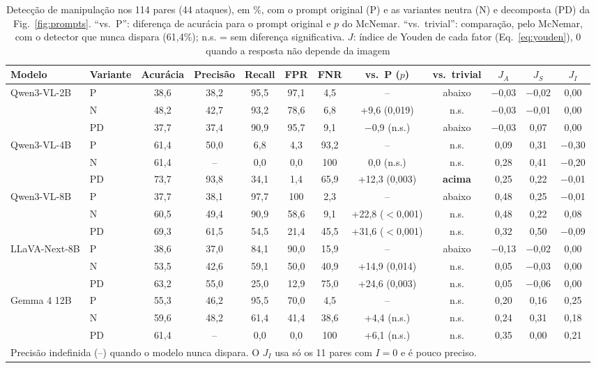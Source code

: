 \documentclass[conference]{IEEEtran}
\begin{document}
\begin{table}[!t]
\renewcommand{\arraystretch}{1.0}
\caption{Detecção de manipulação nos 114 pares (44 ataques), em \%, com o prompt original (P) e as
variantes neutra (N) e decomposta (PD) da Fig.~\ref{fig:prompts}. ``vs.~P'': diferença de acurácia para o
prompt original e $p$ do McNemar. ``vs.~trivial'': comparação, pelo McNemar, com o detector que nunca
dispara (61,4\%); n.s. = sem diferença significativa. $J$: índice de Youden de cada fator
(Eq.~\ref{eq:youden}), 0 quando a resposta não depende da imagem}
\label{tab:man}
\centering
\footnotesize
\setlength{\tabcolsep}{4.2pt}
\begin{tabular}{llcccccccccc}
\toprule
Modelo & Variante & Acurácia & Precisão & Recall & FPR & FNR & vs.~P ($p$) & vs.~trivial & $J_A$ & $J_S$ & $J_I$ \\
\midrule
\multirow{3}{*}{Qwen3-VL-2B}
 & P  & 38,6 & 38,2 & 95,5 & 97,1 & 4,5 & -- & abaixo & $-$0,03 & $-$0,02 & 0,00 \\
 & N  & 48,2 & 42,7 & 93,2 & 78,6 & 6,8 & +9,6 (0,019) & n.s. & $-$0,03 & $-$0,01 & 0,00 \\
 & PD & 37,7 & 37,4 & 90,9 & 95,7 & 9,1 & $-$0,9 (n.s.) & abaixo & $-$0,03 & 0,07 & 0,00 \\
\midrule
\multirow{3}{*}{Qwen3-VL-4B}
 & P  & 61,4 & 50,0 & 6,8 & 4,3 & 93,2 & -- & n.s. & 0,09 & 0,31 & $-$0,30 \\
 & N  & 61,4 & -- & 0,0 & 0,0 & 100 & 0,0 (n.s.) & n.s. & 0,28 & 0,41 & $-$0,20 \\
 & PD & 73,7 & 93,8 & 34,1 & 1,4 & 65,9 & +12,3 (0,003) & \textbf{acima} & 0,25 & 0,22 & $-$0,01 \\
\midrule
\multirow{3}{*}{Qwen3-VL-8B}
 & P  & 37,7 & 38,1 & 97,7 & 100 & 2,3 & -- & abaixo & 0,48 & 0,25 & $-$0,01 \\
 & N  & 60,5 & 49,4 & 90,9 & 58,6 & 9,1 & +22,8 ($<$0,001) & n.s. & 0,48 & 0,22 & 0,08 \\
 & PD & 69,3 & 61,5 & 54,5 & 21,4 & 45,5 & +31,6 ($<$0,001) & n.s. & 0,32 & 0,50 & $-$0,09 \\
\midrule
\multirow{3}{*}{LLaVA-Next-8B}
 & P  & 38,6 & 37,0 & 84,1 & 90,0 & 15,9 & -- & abaixo & $-$0,13 & $-$0,02 & 0,00 \\
 & N  & 53,5 & 42,6 & 59,1 & 50,0 & 40,9 & +14,9 (0,014) & n.s. & 0,05 & $-$0,03 & 0,00 \\
 & PD & 63,2 & 55,0 & 25,0 & 12,9 & 75,0 & +24,6 (0,003) & n.s. & 0,05 & $-$0,06 & 0,00 \\
\midrule
\multirow{3}{*}{Gemma 4 12B}
 & P  & 55,3 & 46,2 & 95,5 & 70,0 & 4,5 & -- & n.s. & 0,20 & 0,16 & 0,25 \\
 & N  & 59,6 & 48,2 & 61,4 & 41,4 & 38,6 & +4,4 (n.s.) & n.s. & 0,24 & 0,31 & 0,18 \\
 & PD & 61,4 & -- & 0,0 & 0,0 & 100 & +6,1 (n.s.) & n.s. & 0,35 & 0,00 & 0,21 \\
\bottomrule
\multicolumn{12}{l}{\scriptsize Precisão indefinida (--) quando o modelo nunca dispara. O $J_I$ usa só os 11 pares com $I=0$ e é pouco preciso.}
\end{tabular}
\end{table}
\end{document}
